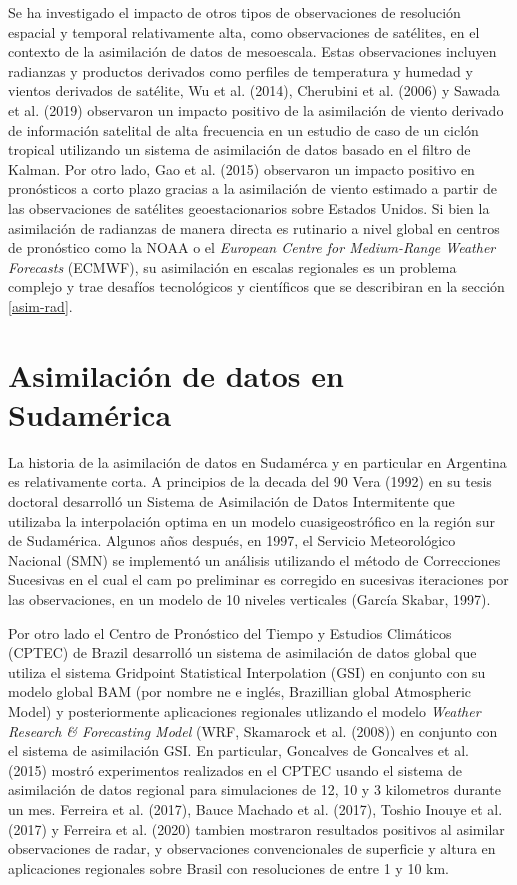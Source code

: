 \documentclass[12pt,oneside]{reedthesis}
\begin{document}
Se ha investigado el impacto de otros tipos de observaciones de resolución espacial y temporal relativamente alta, como observaciones de satélites, en el contexto de la asimilación de datos de mesoescala. Estas observaciones incluyen radianzas y productos derivados como perfiles de temperatura y humedad y vientos derivados de satélite, Wu et al. (2014), Cherubini et al. (2006) y Sawada et al. (2019) observaron un impacto positivo de la asimilación de viento derivado de información satelital de alta frecuencia en un estudio de caso de un ciclón tropical utilizando un sistema de asimilación de datos basado en el filtro de Kalman. Por otro lado, Gao et al. (2015) observaron un impacto positivo en pronósticos a corto plazo gracias a la asimilación de viento estimado a partir de las observaciones de satélites geoestacionarios sobre Estados Unidos. Si bien la asimilación de radianzas de manera directa es rutinario a nivel global en centros de pronóstico como la NOAA o el \emph{European Centre for Medium-Range Weather Forecasts} (ECMWF), su asimilación en escalas regionales es un problema complejo y trae desafíos tecnológicos y científicos que se describiran en la sección \ref{asim-rad}.

\hypertarget{asimilaciuxf3n-de-datos-en-sudamuxe9rica}{%
\section{Asimilación de datos en Sudamérica}\label{asimilaciuxf3n-de-datos-en-sudamuxe9rica}}

La historia de la asimilación de datos en Sudamérca y en particular en Argentina es relativamente corta. A principios de la decada del 90 Vera (1992) en su tesis doctoral desarrolló un Sistema de Asimilación de Datos Intermitente que utilizaba la interpolación optima en un modelo cuasigeostrófico en la región sur de Sudamérica. Algunos años después, en 1997, el Servicio Meteorológico Nacional (SMN) se implementó un
análisis utilizando el método de Correcciones Sucesivas en el cual el cam po preliminar
es corregido en sucesivas iteraciones por las observaciones, en un modelo de 10 niveles verticales (García Skabar, 1997).

Por otro lado el Centro de Pronóstico del Tiempo y Estudios Climáticos (CPTEC) de Brazil desarrolló un sistema de asimilación de datos global que utiliza el sistema Gridpoint Statistical Interpolation (GSI) en conjunto con su modelo global BAM (por nombre ne e inglés, Brazillian global Atmospheric Model) y posteriormente aplicaciones regionales utlizando el modelo \emph{Weather Research \& Forecasting Model} (WRF, Skamarock et al. (2008)) en conjunto con el sistema de asimilación GSI. En particular, Goncalves de Goncalves et al. (2015) mostró experimentos realizados en el CPTEC usando el sistema de asimilación de datos regional para simulaciones de 12, 10 y 3 kilometros durante un mes. Ferreira et al. (2017), Bauce Machado et al. (2017), Toshio Inouye et al. (2017) y Ferreira et al. (2020) tambien mostraron resultados positivos al asimilar observaciones de radar, y observaciones convencionales de superficie y altura en aplicaciones regionales sobre Brasil con resoluciones de entre 1 y 10 km.
\end{document}
